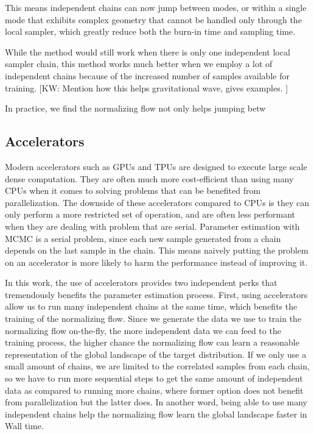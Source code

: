 \documentclass[twocolumn]{aastex631}
\newcommand{\kw}[1]{{\color{rb4}[KW: #1 ]}}
\begin{document}

This means independent chains can now jump between modes, or within a single
mode that exhibits complex geometry that cannot be handled only through the
local sampler, which greatly reduce both the burn-in time and sampling time.

While the method would still work when there is only one independent local
sampler chain, this method works much better when we employ a lot of independent
chains because of the increased number of samples available for training. 
\kw{Mention how this helps gravitational wave, gives examples.}

In practice, we find the normalizing flow not only helps jumping betw

\subsection{Accelerators}
\label{sec:accelerators}

Modern accelerators such as GPUs and TPUs are designed to execute large scale
dense computation. They are often much more cost-efficient than using many CPUs
when it comes to solving problems that can be benefited from parallelization.
The downside of these accelerators compared to CPUs is they can only perform a
more restricted set of operation, and are often less performant when they are
dealing with problem that are serial. Parameter estimation with MCMC is a serial
problem, since each new sample generated from a chain depends on the last sample
in the chain. This means naively putting the problem on an accelerator is more
likely to harm the performance instead of improving it.


In this work, the use of accelerators provides two independent perks that
tremendously benefits the parameter estimation process. First, using
accelerators allow us to run many independent chains at the same time, which
benefits the training of the normalizing flow. Since we generate the data we use
to train the normalizing flow on-the-fly, the more independent data we can feed
to the training process, the higher chance the normalizing flow can learn a
reasonable representation of the global landscape of the target distribution. If
we only use a small amount of chains, we are limited to the correlated samples
from each chain, so we have to run more sequential steps to get the same amount
of independent data as compared to running more chains, where former option does
not benefit from parallelization but the latter does. In another word, being
able to use many independent chains help the normalizing flow learn the global
landscape faster in Wall time.
\end{document}

